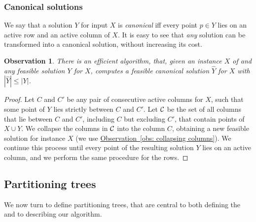 \documentclass[11pt]{article}
\numberwithin{equation}{section}
\theoremstyle{definition}
\theoremstyle{plain}
\newcommand{\expref}[2]{\hyperref[#2]{#1~\ref{#2}}}
\newtheorem{myobs}[theorem]{Observation}
\begin{document}
%



\subsubsection{Canonical solutions} 
We say that a solution $Y$ for input $X$ is \emph{canonical} iff every point $p\in Y$ lies on an active row and an active column of $X$. %
%
It is easy to see that \emph{any} solution can be transformed into a canonical solution, without increasing its cost. %

\begin{myobs} \label{obs: canonical solutions} There is an efficient algorithm, that, given an instance $X$ of \minsat and
	 any feasible solution $Y$ for $X$, computes a feasible canonical solution $\hat{Y}$ for $X$ with $|\hat{Y}| \leq |Y|$.  %
\end{myobs} 
\begin{proof}
Let $C$ and $C'$ be any pair of consecutive active columns for $X$, such that some point of $Y$ lies strictly between $C$ and $C'$. Let ${\mathcal C}$ be the set of all columns that lie between $C$ and $C'$, including $C$ but excluding $C'$, that contain points of $X\cup Y$. We collapse the columns in ${\mathcal C}$ into the column $C$, obtaining a new feasible solution for instance $X$ (we use \expref{Observation}{obs: collapsing columns}). We continue this process until every point of the resulting solution $Y$ lies on an active column, and we perform the same procedure for the rows.
\end{proof}

\subsection{Partitioning trees}

We now turn to define partitioning trees, that are central to both defining the \WBone and to describing our algorithm.
\end{document}
